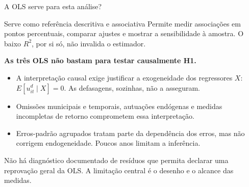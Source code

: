 \documentclass[aspectratio=169,11pt]{beamer}
\newcommand{\fonte}[1]{\par\vfill{\fontsize{7.5}{9}\selectfont\color{gray}Fonte: #1\par}}
\begin{document}
\begin{frame}{A OLS serve para esta análise?}
\begin{block}{Serve como referência descritiva e associativa}
Permite medir associações em pontos percentuais, comparar ajustes e mostrar a sensibilidade à amostra. O baixo $R^2$, por si só, não invalida o estimador.
\end{block}
\medskip
\textbf{As três OLS não bastam para testar causalmente H1.}
\small
\begin{itemize}
\setlength{\itemsep}{2mm}
\item A interpretação causal exige justificar a exogeneidade dos regressores $X$: $E[u^d_{it}\mid X]=0$. As defasagens, sozinhas, não a asseguram.
\item Omissões municipais e temporais, autuações endógenas e medidas incompletas de retorno comprometem essa interpretação.
\item Erros-padrão agrupados tratam parte da dependência dos erros, mas não corrigem endogeneidade. Poucos anos limitam a inferência.
\end{itemize}
\medskip
Não há diagnóstico documentado de resíduos que permita declarar uma reprovação geral da OLS. A limitação central é o desenho e o alcance das medidas.
\end{frame}
\end{document}
